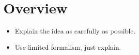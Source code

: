 \section{Overview}\label{sec:overview}

\begin{itemize}
  \item Explain the idea as carefully as possible.
  \item Use limited formalism, just explain.
\end{itemize}
